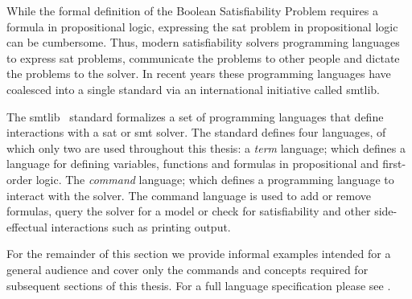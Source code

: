 While the formal definition of the Boolean Satisfiability Problem requires a
formula in propositional logic, expressing the \ac{sat} problem in propositional
logic can be cumbersome. Thus, modern satisfiability solvers programming
languages to express \ac{sat} problems, communicate the problems to other people
and dictate the problems to the solver. In recent years these programming
languages have coalesced into a single standard via an international initiative
called \acl{smtlib}.

The \acl{smtlib}~\cite{BarFT-SMTLIB} standard formalizes a set of programming
languages that define interactions with a \ac{sat} or \ac{smt} solver. The
standard defines four languages, of which only two are used throughout this
thesis: a \emph{term} language; which defines a language for defining variables,
functions and formulas in propositional and first-order logic. The
\emph{command} language; which defines a programming language to interact with
the solver. The command language is used to add or remove formulas, query the
solver for a model or check for satisfiability and other side-effectual
interactions such as printing output.

For the remainder of this section we provide informal examples intended for a
general audience and cover only the commands and concepts required for
subsequent sections of this thesis. For a full language specification please see
\citet{BarFT-SMTLIB}.

